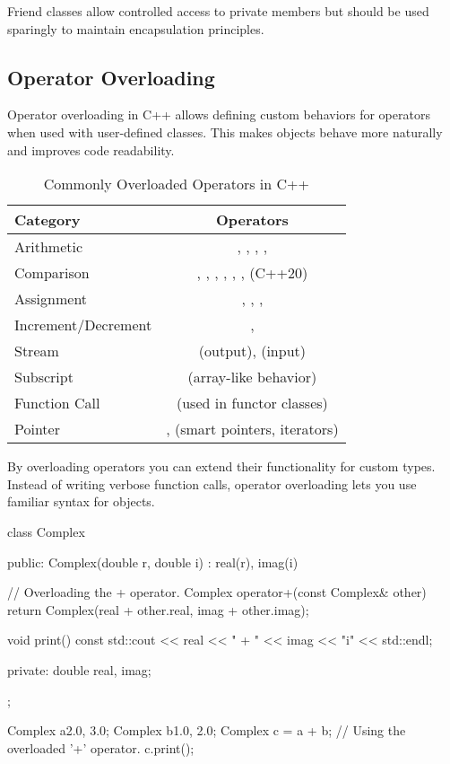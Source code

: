 Friend classes allow controlled access to private members but should be used sparingly to maintain encapsulation principles.


\subsection{Operator Overloading}

Operator overloading in C++ allows defining custom behaviors for operators when used with user-defined classes. This makes objects behave more naturally and improves code readability.

\begin{table}[H]
    \centering
    \setlength{\tabcolsep}{20pt}
    \begin{tabulary}{\linewidth}{@{} L C @{}}
        \toprule
        \hfill \textbf{Category} \hfill & \textbf{Operators} \\
        \midrule
        Arithmetic & \plaintt{+}, \plaintt{-}, \plaintt{*}, \plaintt{/}, \plaintt{\%} \\
        Comparison & \plaintt{==}, \plaintt{!=}, \plaintt{<}, \plaintt{>}, \plaintt{<=}, \plaintt{>=}, \plaintt{<=>} (C++20) \\
        Assignment & \plaintt{=}, \plaintt{+=}, \plaintt{-=}, \plaintt{*=} \\
        Increment/Decrement & \plaintt{++}, \plaintt{--} \\
        Stream & \plaintt{<<} (output), \plaintt{>>} (input) \\
        Subscript & \plaintt{[]} (array-like behavior) \\
        Function Call & \plaintt{()} (used in functor classes) \\
        Pointer & \plaintt{->}, \plaintt{*} (smart pointers, iterators) \\
        \bottomrule
    \end{tabulary}
    \caption{Commonly Overloaded Operators in C++}
\end{table}

\newpage

By overloading operators you can extend their functionality for custom types. Instead of writing verbose function calls, operator overloading lets you use familiar syntax for objects.

\begin{exampleblock}
\begin{codeblock}[language=C++, numbers=none]
class Complex {
public:
    Complex(double r, double i) : real(r), imag(i) {}

    // Overloading the + operator.
    Complex operator+(const Complex& other) {
        return Complex(real + other.real, imag + other.imag);
    }

    void print() const {
        std::cout << real << " + " << imag << "i" << std::endl;
    }

private:
    double real, imag;
};

Complex a{2.0, 3.0};
Complex b{1.0, 2.0};
Complex c = a + b; // Using the overloaded '+' operator.
c.print();
\end{codeblock}
\end{exampleblock}

